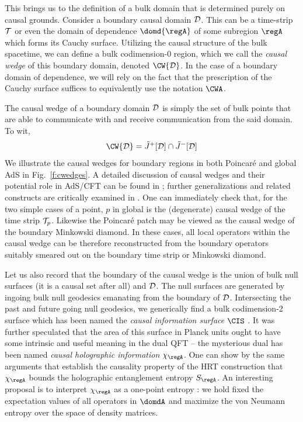 \documentclass[12pt,openany]{book}
\begin{document}
This brings us to the definition of a bulk domain that is determined purely on causal grounds. Consider a boundary causal domain ${\cal D}$.  This can be a time-strip ${\cal T}$ or even the  domain of dependence  $\domd{\regA}$ of some subregion $\regA$ which forms its Cauchy surface. Utilizing the causal structure of the bulk spacetime, we can define a bulk codimension-0 region, which we call the \emph{causal wedge} of this boundary domain, denoted $\CW{{\cal D}}$. In the case of a boundary domain of dependence, we will rely on the fact that the prescription of the Cauchy surface suffices to equivalently use the notation $\CWA$.

The causal wedge of a boundary domain ${\cal D}$ is simply the set of bulk points that are able to communicate with and receive communication from the said domain. To wit,
%
\begin{equation}
\CW{{\cal D}} = \tilde{J}^+[ {\cal D}] \cap  \tilde{J}^-[ {\cal D} ]
\label{eq:cwedge}
\end{equation}
%
We illustrate the causal wedges for boundary regions in both Poincar\'e and global AdS in Fig.~\ref{f:cwedges}.
A detailed discussion of causal wedges and their potential role in AdS/CFT can be found in \cite{Hubeny:2012wa,Hubeny:2013gba}; further generalizations and related constructs are critically examined in \cite{Hubeny:2014qwa}.
One can immediately check that, for the two simple cases of a point, $p$ in global  is the (degenerate) causal wedge of the time strip ${\cal T}_p$. Likewise the Poincar\'e patch may be viewed as the causal wedge of the boundary Minkowski diamond.
In these cases, all local operators within the causal wedge can be therefore reconstructed from the boundary operators suitably smeared out on the boundary time strip or Minkowski diamond.

Let us also record that the boundary of the causal wedge is the union of bulk null surfaces (it is a causal set after all) and ${\cal D}$.  The null surfaces are generated by ingoing bulk null geodesics emanating from the boundary of ${\cal D}$. Intersecting the past and future going null geodesics, we generically find a bulk codimension-2 surface which has been named the \emph{causal information surface } $\CIS$ \cite{Hubeny:2012wa}. It was further speculated that the area of this surface in Planck units ought to have some intrinsic and useful meaning in the dual QFT -- the mysterious dual has been named \emph{causal holographic information} $\chi_\regA$. One can show by the same arguments that establish the causality property of the HRT construction that $\chi_\regA$ bounds the holographic entanglement entropy $S_\regA$.  An interesting proposal is to interpret $\chi_\regA$ as a one-point entropy \cite{Kelly:2013aja}: we hold fixed the expectation values of all operators in $\domdA$ and maximize the von Neumann entropy over the space of density matrices.
\end{document}
